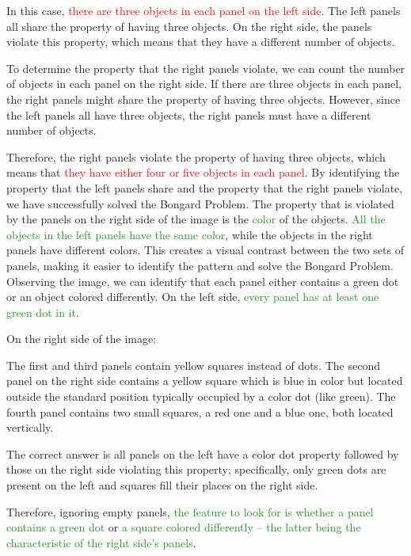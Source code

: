 \begin{tcolorbox}[breakable,enhanced jigsaw,opacityback=0,]
\begin{dialogue}
		In this case, \textcolor{red}{there are three objects in each panel on the left side}. The left panels all share the property of having three objects. On the right side, the panels violate this property, which means that they have a different number of objects.
		
		To determine the property that the right panels violate, we can count the number of objects in each panel on the right side. If there are three objects in each panel, the right panels might share the property of having three objects. However, since the left panels all have three objects, the right panels must have a different number of objects.
		
		Therefore, the right panels violate the property of having three objects, which means that \textcolor{red}{they have either four or five objects in each panel}. By identifying the property that the left panels share and the property that the right panels violate, we have successfully solved the Bongard Problem.
		\vspace{1em}
		 The property that is violated by the panels on the right side of the image is the \textcolor{ForestGreen}{color} of the objects. \textcolor{ForestGreen}{All the objects in the left panels have the same color}, while the objects in the right panels have different colors. This creates a visual contrast between the two sets of panels, making it easier to identify the pattern and solve the Bongard Problem.
		\vspace{1em}
		 Observing the image, we can identify that each panel either contains a green dot or an object colored differently. On the left side, \textcolor{ForestGreen}{every panel has at least one green dot in it}.
		
		On the right side of the image:
		
		The first and third panels contain yellow squares instead of dots.
		The second panel on the right side contains a yellow square which is blue in color but located outside the standard position typically occupied by a color dot (like green).
		The fourth panel contains two small squares, a red one and a blue one, both located vertically.
		
		The correct answer is all panels on the left have a color dot property followed by those on the right side violating this property; specifically, only green dots are present on the left and squares fill their places on the right side.
		
		Therefore, ignoring empty panels, \textcolor{ForestGreen}{the feature to look for is whether a panel contains a green dot} or \textcolor{ForestGreen}{a square colored differently – the latter being the characteristic of the right side's panels}.
	\end{dialogue}
	\label{fig:task4-bongard}
\end{tcolorbox}




